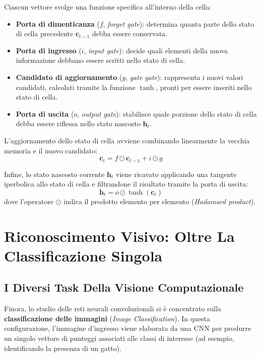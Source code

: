 ﻿\documentclass[11pt, a4paper]{article}
\begin{document}
Ciascun vettore svolge una funzione specifica all'interno della cella:
\begin{itemize}
    \item \textbf{Porta di dimenticanza} ($f$, \emph{forget gate}): determina quanta parte dello stato di cella precedente $\bm{c}_{t-1}$ debba essere conservata.
    \item \textbf{Porta di ingresso} ($i$, \emph{input gate}): decide quali elementi della nuova informazione debbano essere scritti nello stato di cella.
    \item \textbf{Candidato di aggiornamento} ($g$, \emph{gate gate}): rappresenta i nuovi valori candidati, calcolati tramite la funzione $\tanh$, pronti per essere inseriti nello stato di cella.
    \item \textbf{Porta di uscita} ($o$, \emph{output gate}): stabilisce quale porzione dello stato di cella debba essere riflessa nello stato nascosto $\bm{h}_t$.
\end{itemize}

L'aggiornamento dello stato di cella avviene combinando linearmente la vecchia memoria e il nuovo candidato:
\[
\bm{c}_t = f \odot \bm{c}_{t-1} + i \odot g
\]

Infine, lo stato nascosto corrente $\bm{h}_t$ viene ricavato applicando una tangente iperbolica allo stato di cella e filtrandone il risultato tramite la porta di uscita:
\[
\boxed{\bm{h}_t = o \odot \tanh(\bm{c}_t)}
\]
dove l'operatore $\odot$ indica il prodotto elemento per elemento (\emph{Hadamard product}).

\newpage

\section{Riconoscimento Visivo: Oltre La Classificazione Singola}

\subsection{I Diversi Task Della Visione Computazionale}

Finora, lo studio delle reti neurali convoluzionali si è concentrato sulla \textbf{classificazione delle immagini} (\emph{Image Classification}). In questa configurazione, l'immagine d'ingresso viene elaborata da una CNN per produrre un singolo vettore di punteggi associati alle classi di interesse (ad esempio, identificando la presenza di un gatto).

\end{document}
